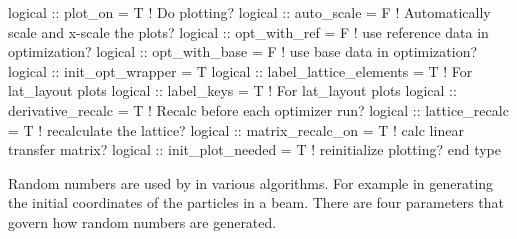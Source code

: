 {{\begin{example}
  logical :: plot_on = T               ! Do plotting?
  logical :: auto_scale = F            ! Automatically scale and x-scale the plots?
  logical :: opt_with_ref = F          ! use reference data in optimization?
  logical :: opt_with_base = F         ! use base data in optimization?
  logical :: init_opt_wrapper = T
  logical :: label_lattice_elements = T ! For lat_layout plots
  logical :: label_keys = T             ! For lat_layout plots
  logical :: derivative_recalc = T      ! Recalc before each optimizer run?
  logical :: lattice_recalc = T         ! recalculate the lattice?
  logical :: matrix_recalc_on = T       ! calc linear transfer matrix?  
  logical :: init_plot_needed = T       ! reinitialize plotting?
end type
\end{example}

Random numbers are used by \tao in various algorithms. For example in
generating the initial coordinates of the particles in a beam. There
are four parameters that govern how random numbers are generated.

\vn{global%
number generator. A value of \vn{0} (the default) causes the seed
number to be picked based upon the system clock. Use the \vn{show
global} command to see what the seed number is.

\vn{global%
the random numbers. \vn{'pseudo'} causes \tao to use a pseudo-random
number generator. \vn{'quasi'} uses Sobel quasi-random number
generator which generates a distribution that is smoother then the
pseudo-random number generator. \vn{'quasi'} is the default.

\vn{global%
conversion from a uniform distribution to a Gaussian distribution.
\vn{'exact'} is an exact conversion and \vn{'limited'} has a cut-off
so that no particles are generated beyond. This cutoff is set by
\vn{global%



}}}}}}
